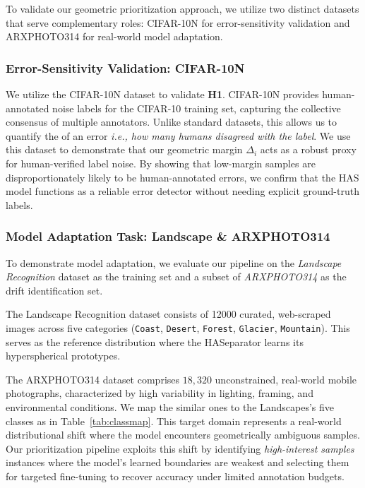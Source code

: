 
To validate our geometric prioritization approach, we utilize two distinct datasets that serve complementary roles: CIFAR-10N for error-sensitivity validation and ARXPHOTO314 for real-world model adaptation.

\subsubsection{Error-Sensitivity Validation: CIFAR-10N}
\label{sec:cifar10n}
We utilize the CIFAR-10N dataset to validate \textbf{H1}. CIFAR-10N provides human-annotated noise labels for the CIFAR-10 training set, capturing the collective consensus of multiple annotators. Unlike standard datasets, this allows us to quantify the  of an error \textit{i.e., how many humans disagreed with the label}. We use this dataset to demonstrate that our geometric margin $\Delta_i$ acts as a robust proxy for human-verified label noise. By showing that low-margin samples are disproportionately likely to be human-annotated errors, we confirm that the HAS model functions as a reliable error detector without needing explicit ground-truth labels.

\subsubsection{Model Adaptation Task: Landscape \& ARXPHOTO314}
\label{sec:target_datasets}
To demonstrate model adaptation, we evaluate our pipeline on the \textit{Landscape Recognition} dataset \cite{utkarsh} as the training set and a subset of \textit{ARXPHOTO314} \cite{arxnetsa:2025} as the drift identification set. 

The Landscape Recognition dataset consists of 12000 curated, web-scraped images across five categories (\texttt{Coast}, \texttt{Desert}, \texttt{Forest}, \texttt{Glacier}, \texttt{Mountain}). This serves as the reference distribution where the HASeparator learns its hyperspherical prototypes. 

The ARXPHOTO314 dataset comprises $18{,}320$ unconstrained, real-world mobile photographs, characterized by high variability in lighting, framing, and environmental conditions. We map the similar ones to the Landscapes's five classes as in Table~\ref{tab:classmap}. This target domain represents a real-world distributional shift where the model encounters geometrically ambiguous samples. Our prioritization pipeline exploits this shift by identifying \textit{high-interest samples} instances where the model’s learned boundaries are weakest and selecting them for targeted fine-tuning to recover accuracy under limited annotation budgets.


